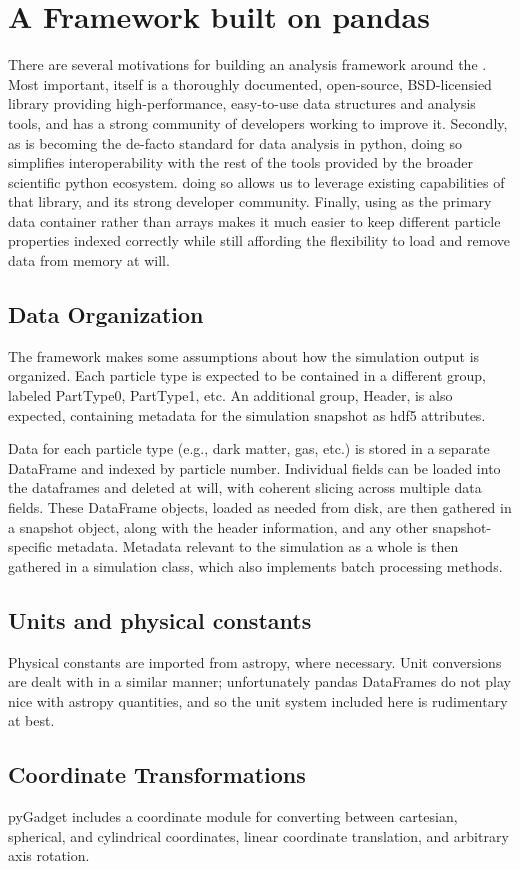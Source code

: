 \section{A Framework built on pandas}
\label{framework}

There are several motivations for building an analysis framework around the . 
Most important,  itself is a thoroughly documented, open-source, BSD-licensied library providing high-performance, easy-to-use data structures and analysis tools, and has a strong community of developers working to improve it.  
Secondly, as  is becoming the de-facto standard for data analysis in python, doing so simplifies interoperability with the rest of the tools provided by the broader scientific python ecosystem.
doing so allows us to leverage existing capabilities of that library, and its strong developer community.
Finally, using  as the primary data container rather than  arrays makes it much easier to keep different particle properties indexed correctly while still affording the flexibility to load and remove data from memory at will.

\subsection{Data Organization}
\label{hierarchy}
The framework makes some assumptions about how the simulation output is organized.  Each particle type is expected to be contained in a different group, labeled PartType0, PartType1, etc. An additional group, Header, is also expected, containing metadata for the simulation snapshot as hdf5 attributes.  

Data for each particle type (e.g., dark matter, gas, etc.) is stored in a separate DataFrame and indexed by particle number.  Individual fields can be loaded into the dataframes and deleted at will, with coherent slicing across multiple data fields.   These DataFrame objects, loaded as needed from disk, are then gathered in a snapshot object, along with the header information, and any other snapshot-specific metadata.  Metadata relevant to the simulation as a whole is then gathered in a simulation class, which also implements batch processing methods.

\subsection{Units and physical constants}
\label{units}
Physical constants are imported from astropy, where necessary.  Unit conversions are dealt with in a similar manner; unfortunately pandas DataFrames do not play nice with astropy quantities, and so the unit system included here is rudimentary at best.

\subsection{Coordinate Transformations}
\label{coordinates}
pyGadget includes a coordinate module for converting between cartesian, spherical, and cylindrical coordinates, linear coordinate translation, and arbitrary axis rotation.